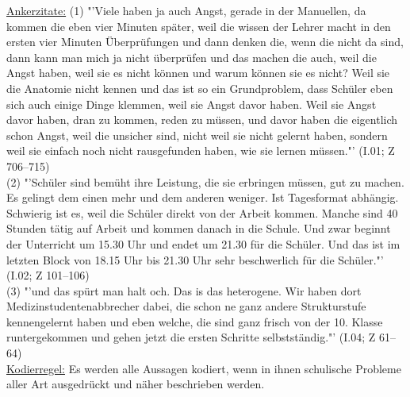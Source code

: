 \underline{Ankerzitate:} (1) "'Viele haben ja auch Angst, gerade in der Manuellen, da kommen die eben vier Minuten später, weil die wissen der Lehrer macht in den ersten vier Minuten Überprüfungen und dann denken die, wenn die nicht da sind, dann kann man mich ja nicht überprüfen und das machen die auch, weil die Angst haben, weil sie es nicht können und warum können sie es nicht? Weil sie die Anatomie nicht kennen und das ist so ein Grundproblem, dass Schüler eben sich auch einige Dinge klemmen, weil sie Angst davor haben. Weil sie Angst davor haben, dran zu kommen, reden zu müssen, und davor haben die eigentlich schon Angst, weil die unsicher sind, nicht weil sie nicht gelernt haben, sondern weil sie einfach noch nicht rausgefunden haben, wie sie lernen müssen."' (I.01; Z 706--715)\\
(2) "'Schüler sind bemüht ihre Leistung, die sie erbringen müssen, gut zu machen. Es gelingt dem einen mehr und dem anderen weniger. Ist Tagesformat abhängig. Schwierig ist es, weil die Schüler direkt von der Arbeit kommen. Manche sind 40 Stunden tätig auf Arbeit und kommen danach in die Schule. Und zwar beginnt der Unterricht um 15.30 Uhr und endet um 21.30 für die Schüler. Und das ist im letzten Block von 18.15 Uhr bis 21.30 Uhr sehr beschwerlich für die Schüler."' (I.02; Z 101--106)\\ (3) "'und das spürt man halt och. Das is das heterogene. Wir haben dort Medizinstudentenabbrecher dabei, die schon ne ganz andere Strukturstufe kennengelernt haben und eben welche, die sind ganz frisch von der 10. Klasse runtergekommen und gehen jetzt die ersten Schritte selbstständig."' (I.04; Z 61--64)\\
\underline{Kodierregel:} Es werden alle Aussagen kodiert, wenn in ihnen schulische Probleme aller Art ausgedrückt und näher beschrieben werden.\\

